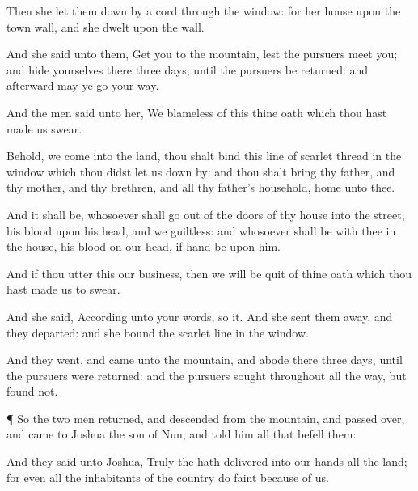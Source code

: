 {Then she let them
down by a
cord
through the
window: for her
house
{} upon the
town
wall, and she
dwelt upon the
wall.

And she
said unto them,
Get you to the
mountain, lest the
pursuers
meet you; and
hide yourselves there
three
days, until the
pursuers be
returned: and
afterward may ye
go your
way.

And the
men
said unto her, We
{}
blameless of this thine
oath which thou hast made us
swear.

Behold,
{} we
come into the
land, thou shalt
bind this
line of
scarlet
thread in the
window which thou didst let us down
by: and thou shalt
bring thy
father, and thy
mother, and thy
brethren, and all thy
father’s
household,
home unto thee.

And it shall be,
{}
whosoever shall go
out of the
doors of thy
house into the
street, his
blood
{} upon his
head, and we
{}
guiltless: and whosoever shall be with thee in the
house, his
blood
{} on our
head, if
{}
hand be upon him.

And if thou
utter this our
business, then we will be
quit of thine
oath which thou hast made us to
swear.

And she
said, According unto your
words, so
{} it. And she sent them
away, and they
departed: and she
bound the
scarlet
line in the
window.


\par }{\PP {}And they
went, and
came unto the
mountain, and
abode there
three
days, until the
pursuers were
returned: and the
pursuers
sought
{} throughout all the
way, but
found
{} not.


\par }{\PP {}¶ So the
two
men
returned, and
descended from the
mountain, and passed
over, and
came to
Joshua the
son of
Nun, and
told him all
{} that
befell them:

And they
said unto
Joshua,
Truly the
{} hath
delivered into our
hands all the
land; for even all the
inhabitants of the
country do
faint
because of us.




\par }
